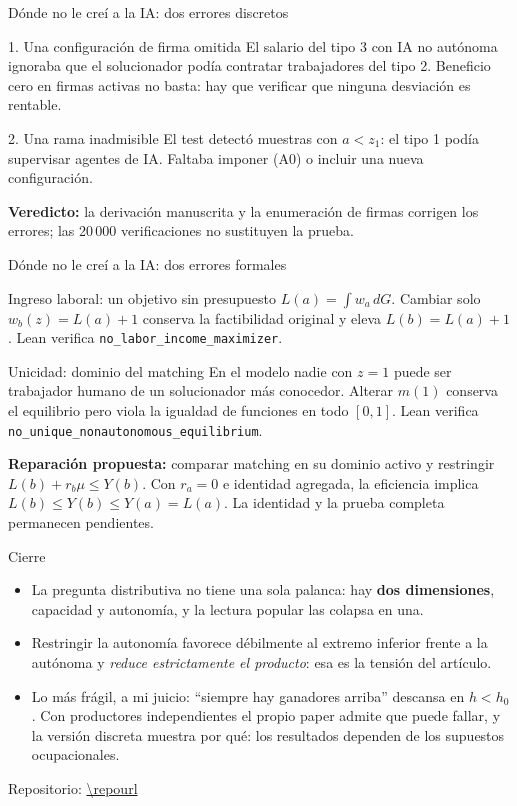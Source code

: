 \documentclass[11pt,aspectratio=169]{beamer}
\begin{document}
\begin{frame}{Dónde no le creí a la IA: dos errores discretos}
  \begin{block}{1. Una configuración de firma omitida}
    El salario del tipo 3 con IA no autónoma ignoraba que el solucionador podía
    contratar trabajadores del tipo 2. Beneficio cero en firmas activas no basta:
    hay que verificar que ninguna desviación es rentable.
  \end{block}
  \begin{block}{2. Una rama inadmisible}
    El test detectó muestras con $a<z_1$: el tipo 1 podía supervisar agentes de IA.
    Faltaba imponer (A0) o incluir una nueva configuración.
  \end{block}
  \vfill
  \textbf{Veredicto:} la derivación manuscrita y la enumeración de firmas
  corrigen los errores; las 20\,000 verificaciones no sustituyen la prueba.
\end{frame}
\begin{frame}{Dónde no le creí a la IA: dos errores formales}
  \small
  \begin{block}{Ingreso laboral: un objetivo sin presupuesto}
    $L(a)=\int w_a\,dG$. Cambiar solo $w_b(z)=L(a)+1$ conserva la factibilidad
    original y eleva $L(b)=L(a)+1$. Lean verifica
    \texttt{no\_labor\_income\_maximizer}.
  \end{block}
  \begin{block}{Unicidad: dominio del matching}
    En el modelo nadie con $z=1$ puede ser trabajador humano de un solucionador
    más conocedor. Alterar $m(1)$ conserva el equilibrio pero viola la igualdad
    de funciones en todo $[0,1]$.
    Lean verifica \texttt{no\_unique\_nonautonomous\_equilibrium}.
  \end{block}
  \textbf{Reparación propuesta:} comparar matching en su dominio activo y
  restringir $L(b)+r_b\mu\le Y(b)$. Con $r_a=0$ e identidad agregada,
  la eficiencia implica $L(b)\le Y(b)\le Y(a)=L(a)$.
  La identidad y la prueba completa permanecen pendientes.
\end{frame}

\begin{frame}{Cierre}
  \begin{itemize}
    \item La pregunta distributiva no tiene una sola palanca: hay \textbf{dos dimensiones}, capacidad y
      autonomía, y la lectura popular las colapsa en una.
    \item Restringir la autonomía favorece débilmente al extremo inferior frente a la autónoma y
      \emph{reduce estrictamente el producto}: esa es la tensión del artículo.
    \item Lo más frágil, a mi juicio: ``siempre hay ganadores arriba'' descansa en $h<h_0$. Con
      productores independientes el propio paper admite que puede fallar, y la versión discreta muestra
      por qué: los resultados dependen de los supuestos ocupacionales.
  \end{itemize}
  \vfill
  \centering\small Repositorio: \url{\repourl}
\end{frame}
\end{document}
